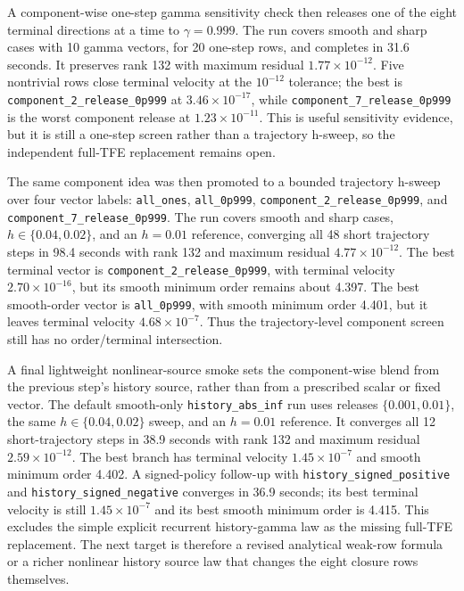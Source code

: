 \documentclass[11pt]{article}
\newcommand{\tfe}{TFE}
\begin{document}
A component-wise one-step gamma sensitivity check then releases one of the
eight terminal directions at a time to $\gamma=0.999$.  The run covers smooth
and sharp cases with 10 gamma vectors, for 20 one-step rows, and completes in
31.6 seconds.  It preserves rank 132 with maximum residual
$1.77\times10^{-12}$.  Five nontrivial rows close terminal velocity at the
$10^{-12}$ tolerance; the best is
\texttt{component\_2\_release\_0p999} at $3.46\times10^{-17}$, while
\texttt{component\_7\_release\_0p999} is the worst component release at
$1.23\times10^{-11}$.  This is useful sensitivity evidence, but it is still a
one-step screen rather than a trajectory h-sweep, so the independent
full-\tfe{} replacement remains open.

The same component idea was then promoted to a bounded trajectory h-sweep over
four vector labels:
\texttt{all\_ones}, \texttt{all\_0p999},
\texttt{component\_2\_release\_0p999}, and
\texttt{component\_7\_release\_0p999}.  The run covers smooth and sharp cases,
$h\in\{0.04,0.02\}$, and an $h=0.01$ reference, converging all 48 short
trajectory steps in 98.4 seconds with rank 132 and maximum residual
$4.77\times10^{-12}$.  The best terminal vector is
\texttt{component\_2\_release\_0p999}, with terminal velocity
$2.70\times10^{-16}$, but its smooth minimum order remains about 4.397.  The
best smooth-order vector is \texttt{all\_0p999}, with smooth minimum order
4.401, but it leaves terminal velocity $4.68\times10^{-7}$.  Thus the
trajectory-level component screen still has no order/terminal intersection.

A final lightweight nonlinear-source smoke sets the component-wise blend from
the previous step's history source, rather than from a prescribed scalar or
fixed vector.  The default smooth-only
\texttt{history\_abs\_inf} run uses releases $\{0.001,0.01\}$, the same
$h\in\{0.04,0.02\}$ sweep, and an $h=0.01$ reference.  It converges all 12
short-trajectory steps in 38.9 seconds with rank 132 and maximum residual
$2.59\times10^{-12}$.  The best branch has terminal velocity
$1.45\times10^{-7}$ and smooth minimum order 4.402.  A signed-policy follow-up
with \texttt{history\_signed\_positive} and
\texttt{history\_signed\_negative} converges in 36.9 seconds; its best
terminal velocity is still $1.45\times10^{-7}$ and its best smooth minimum
order is 4.415.  This excludes the simple explicit recurrent history-gamma
law as the missing full-\tfe{} replacement.  The next target is therefore a
revised analytical weak-row formula or a richer nonlinear history source law
that changes the eight closure rows themselves.
\end{document}
